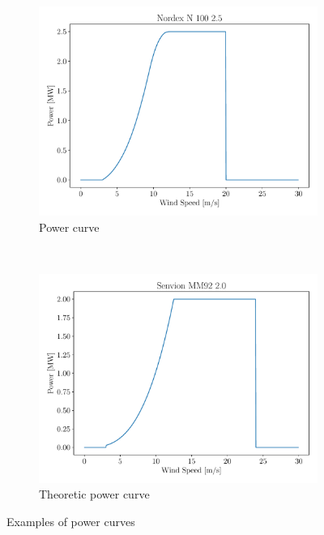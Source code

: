 \documentclass[a4paper, 12pt]{article}
\begin{document}
	\begin{figure}[H]
		\centering
		\begin{subfigure}[t]{0.48\textwidth}
			\centering
			\includegraphics[width=\textwidth]{resources/pdf/wind_pc.pdf}
			\caption{Power curve}
			\label{fig:wind_pc}
		\end{subfigure}
		~ 
		\begin{subfigure}[t]{0.48\textwidth}
			\centering
			\includegraphics[width=\textwidth]{resources/pdf/wind_pc_theoretic.pdf}
			\caption{Theoretic power curve}
			\label{fig:wind_pc_theoretic}
		\end{subfigure}
		\caption{Examples of power curves}
	\end{figure}
\end{document}
